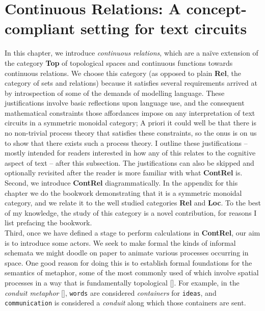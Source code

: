 \section{Continuous Relations: A concept-compliant setting for text circuits}

\begin{fullwidth}

In this chapter, we introduce \emph{continuous relations}, which are a na\"{i}ve extension of the category \textbf{Top} of topological spaces and continuous functions towards continuous relations. We choose this category (as opposed to plain \textbf{Rel}, the category of sets and relations) because it satisfies several requirements arrived at by introspection of some of the demands of modelling language. These justifications involve basic reflections upon language use, and the consequent mathematical constraints those affordances impose on any interpretation of text circuits in a symmetric monoidal category; A priori it could well be that there is no non-trivial process theory that satisfies these constraints, so the onus is on us to show that there exists such a process theory. I outline these justifications -- mostly intended for readers interested in how any of this relates to the cognitive aspect of text -- after this subsection. The justifications can also be skipped and optionally revisited after the reader is more familiar with what \textbf{ContRel} is.\\

Second, we introduce \textbf{ContRel} diagrammatically. In the appendix for this chapter we do the bookwork demonstrating that it is a symmetric monoidal category, and we relate it to the well studied categories \textbf{Rel} and \textbf{Loc}. To the best of my knowledge, the study of this category is a novel contribution, for reasons I list prefacing the bookwork.\\

Third, once we have defined a stage to perform calculations in \textbf{ContRel}, our aim is to introduce some actors. We seek to make formal the kinds of informal schemata we might doodle on paper to animate various processes occurring in space. One good reason for doing this is to establish formal foundations for the semantics of metaphor, some of the most commonly used of which involve spatial processes in a way that is fundamentally topological []. For example, in the \emph{conduit metaphor} [], \texttt{words} are considered \emph{containers} for \texttt{ideas}, and \texttt{communication} is considered a \emph{conduit} along which those containers are sent.


\end{fullwidth}
